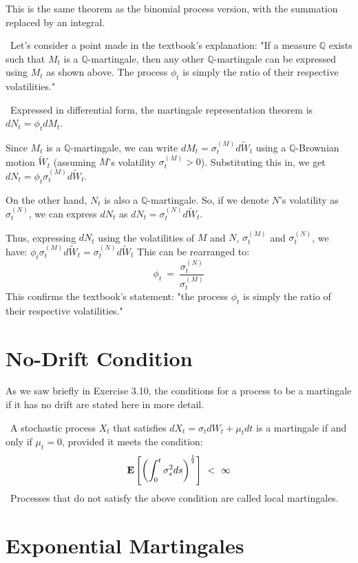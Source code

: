 \documentclass[uplatex,a4j,12pt,dvipdfmx]{jsarticle}
\begin{document}
This is the same theorem as the binomial process version, with the summation replaced by an integral.

\
Let's consider a point made in the textbook's explanation:
"If a measure $\mathbb{Q}$ exists such that $M_{t}$ is a $\mathbb{Q}$-martingale, then any other $\mathbb{Q}$-martingale can be expressed using $M_{t}$ as shown above. The process $\phi_{t}$ is simply the ratio of their respective volatilities."

\
Expressed in differential form, the martingale representation theorem is $d N_{t} = \phi_{t} dM_{t}$.

Since $M_{t}$ is a $\mathbb{Q}$-martingale, we can write $d M_{t} = \sigma^{(M)}_{t} d \tilde{W}_{t}$ using a $\mathbb{Q}$-Brownian motion $\tilde{W}_{t}$ (assuming $M$'s volatility $\sigma^{(M)}_{t} > 0$). Substituting this in, we get $dN_{t} = \phi_{t} \sigma^{(M)}_{t} d \tilde{W}_{t}$.

On the other hand, $N_{t}$ is also a $\mathbb{Q}$-martingale. So, if we denote $N$'s volatility as $\sigma^{(N)}_{t}$, we can express $dN_{t}$ as $dN_{t} = \sigma_{t}^{(N)} d \tilde{W}_{t}$.

Thus, expressing $dN_{t}$ using the volatilities of $M$ and $N$, $\sigma^{(M)}_{t}$ and $\sigma^{(N)}_{t}$, we have:
$
	\phi_{t} \sigma^{(M)}_{t} d \tilde{W}_{t}
	=
	\sigma_{t}^{(N)} d \tilde{W}_{t}
$
This can be rearranged to:
$$
	\phi_{t}
	\ = \
	\dfrac{\sigma_{t}^{(N)}}{\sigma^{(M)}_{t}}
$$
This confirms the textbook's statement: "the process $\phi_{t}$ is simply the ratio of their respective volatilities."

\section{No-Drift Condition}

As we saw briefly in Exercise 3.10, the conditions for a process to be a martingale if it has no drift are stated here in more detail.

\
A stochastic process $X_{t}$ that satisfies $dX_{t}= \sigma_{t} dW_{t} + \mu_{t} dt$ is a martingale if and only if $\mu_{t} = 0$, provided it meets the condition:
$$
	{\bf E}
	\left[
		\left(
		\int^{t}_{0} \sigma_{s}^{2} ds
		\right)^{\frac{1}{2}}
		\right]
	\ < \
	\infty
$$
\
Processes that do not satisfy the above condition are called local martingales.

\section{Exponential Martingales}
\end{document}
